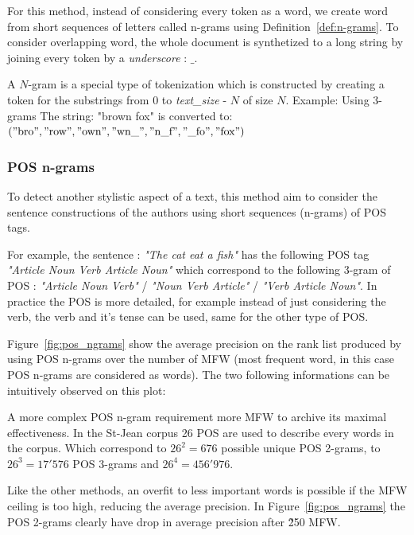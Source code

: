 For this method, instead of considering every token as a word, we create word from short sequences of letters called n-grams using Definition~\ref{def:n-grams}.
To consider overlapping word, the whole document is synthetized to a long string by joining every token by a \textit{underscore} : $\_$.

\begin{definition}[$N$-Grams]
  \label{def:n-grams}
  A $N$-gram is a special type of tokenization which is constructed by creating a token for the substrings from $0$ to \textit{text\_size} - $N$ of size $N$.
  Example: Using 3-grams The string: "brown fox" is converted to: \\
  $("\text{bro}", "\text{row}", "\text{own}", "\text{wn\_}", "\text{n\_f}", "\text{\_fo}", "\text{fox}")$
\end{definition}


\subsubsection{POS n-grams}

To detect another stylistic aspect of a text, this method aim to consider the sentence constructions of the authors using short sequences (n-grams) of POS tags.

For example, the sentence : \textit{"The cat eat a fish"} has the following POS tag \textit{"Article Noun Verb Article Noun"} which correspond to the following 3-gram of POS : \textit{"Article Noun Verb"} / \textit{"Noun Verb Article"} / \textit{"Verb Article Noun"}.
In practice the POS is more detailed, for example instead of just considering the verb, the verb and it's tense can be used, same for the other type of POS.

Figure~\ref{fig:pos_ngrams} show the average precision on the rank list produced by using POS n-grams over the number of MFW (most frequent word, in this case POS n-grams are considered as words).
The two following informations can be intuitively observed on this plot:

A more complex POS n-gram requirement more MFW to archive its maximal effectiveness.
In the St-Jean corpus 26 POS are used to describe every words in the corpus.
Which correspond to $26^2 = 676$ possible unique POS 2-grams, to $26^3 = 17'576$ POS 3-grams and $26^4 = 456'976$.

Like the other methods, an overfit to less important words is possible if the MFW ceiling is too high, reducing the average precision.
In Figure~\ref{fig:pos_ngrams} the POS 2-grams clearly have drop in average precision after \~250 MFW.

